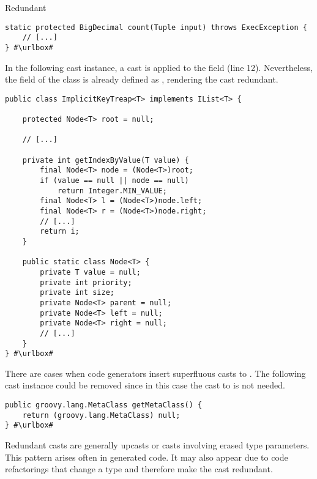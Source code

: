 \begin{pattern}{Redundant}
\begin{verbatim}
static protected BigDecimal count(Tuple input) throws ExecException {
    // [...]
} #\urlbox#
\end{verbatim}

In the following cast instance,%
\def\urlvar{http://bit.ly/phishman3579_java_algorithms_implementation_2SGcH6w}
a cast is applied to the  field (line 12).
Nevertheless, the  field of the  class is already defined as ,
rendering the cast redundant.

\begin{verbatim}
public class ImplicitKeyTreap<T> implements IList<T> {

    protected Node<T> root = null;

    // [...]

    private int getIndexByValue(T value) {
        final Node<T> node = (Node<T>)root;
        if (value == null || node == null)
            return Integer.MIN_VALUE;
        final Node<T> l = (Node<T>)node.left;
        final Node<T> r = (Node<T>)node.right;
        // [...]
        return i;
    }

    public static class Node<T> {
        private T value = null;
        private int priority;
        private int size;
        private Node<T> parent = null;
        private Node<T> left = null;
        private Node<T> right = null;
        // [...]
    }
} #\urlbox#
\end{verbatim}

There are cases when code generators insert superfluous casts to .
The following cast instance%
\def\urlvar{http://bit.ly/togglz_togglz_2SGncXB}
could be removed since in this case the cast to  is not needed.

\begin{verbatim}
public groovy.lang.MetaClass getMetaClass() {
    return (groovy.lang.MetaClass) null;
} #\urlbox#
\end{verbatim}


\discussion{}
Redundant casts are generally upcasts or casts involving erased type parameters.
  This pattern arises often in generated code.
  It may also appear 
due to code refactorings that change a type and therefore make the cast
  redundant.

    
\end{pattern}
